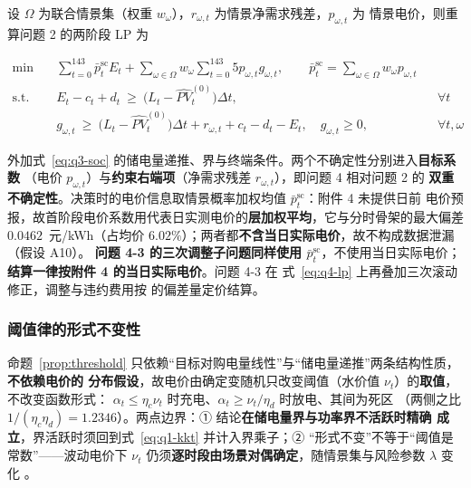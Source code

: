 设 \(\Omega\) 为联合情景集（权重 \(w_\omega\)），\(r_{\omega,t}\) 为情景净需求残差，\(p_{\omega,t}\) 为
情景电价，则重算问题 2 的两阶段 LP 为

\begin{subequations}\label{eq:q4-lp}
\begin{align}
  \min\quad
  & \sum_{t=0}^{143}\bar p^{\text{sc}}_tE_t+\sum_{\omega\in\Omega}w_\omega\sum_{t=0}^{143}5p_{\omega,t}g_{\omega,t},
  \qquad \bar p^{\text{sc}}_t=\sum_{\omega\in\Omega}w_\omega p_{\omega,t} \label{eq:q4-lp-obj}\\
  \text{s.t.}\quad
  & E_t-c_t+d_t\ \ge\ \bigl(L_t-\widehat{PV}^{(0)}_t\bigr)\Delta t, && \forall t \label{eq:q4-lp-plan}\\
  & g_{\omega,t}\ \ge\ \bigl(L_t-\widehat{PV}^{(0)}_t\bigr)\Delta t+r_{\omega,t}+c_t-d_t-E_t,\quad g_{\omega,t}\ge0, && \forall t,\omega \label{eq:q4-lp-gap}
\end{align}
\end{subequations}

外加式~\eqref{eq:q3-soc} 的储电量递推、界与终端条件。两个不确定性分别进入\textbf{目标系数}
（电价 \(p_{\omega,t}\)）与\textbf{约束右端项}（净需求残差 \(r_{\omega,t}\)），即问题 4 相对问题 2 的
\textbf{双重不确定性}。决策时的电价信息取情景概率加权均值 \(\bar p^{\text{sc}}_t\)：附件 4 未提供日前
电价预报，故首阶段电价系数用代表日实测电价的\textbf{层加权平均}，它与分时骨架的最大偏差
\(0.0462\)~元/kWh（占均价 \(6.02\%\)）；两者都\textbf{不含当日实际电价}，故不构成数据泄漏（假设 A10）。
\textbf{问题 4-3 的三次调整子问题同样使用 \(\bar p^{\text{sc}}_t\)}，不使用当日实际电价；
\textbf{结算一律按附件 4 的当日实际电价}。问题 4-3 在
式~\eqref{eq:q4-lp} 上再叠加三次滚动修正，调整与违约费用按  的偏差量定价结算。

\subsubsection{阈值律的形式不变性}

命题~\ref{prop:threshold} 只依赖“目标对购电量线性”与“储电量递推”两条结构性质，\textbf{不依赖电价的
分布假设}，故电价由确定变随机只改变阈值（水价值 \(\nu_t\)）的\textbf{取值}，不改变函数形式：
\(\alpha_t\le\eta_c\nu_t\) 时充电、\(\alpha_t\ge\nu_t/\eta_d\) 时放电、其间为死区
（两侧之比 \(1/(\eta_c\eta_d)=1.2346\)）。两点边界：① 结论\textbf{在储电量界与功率界不活跃时精确
成立}，界活跃时须回到式~\eqref{eq:q1-kkt} 并计入界乘子；② “形式不变”不等于“阈值是常数”——波动电价下
\(\nu_t\) 仍须\textbf{逐时段由场景对偶确定}，随情景集与风险参数 \(\lambda\) 变化 。

